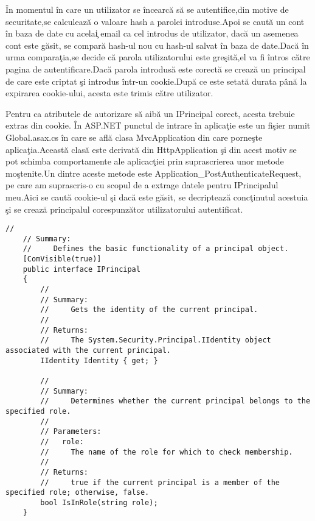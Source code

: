 \documentclass[a4paper,12pt]{report}
\begin{document}
\^In momentul \^in care un utilizator se \^incearc\u a s\u a se autentifice,din motive de securitate,se calculeaz\u a o valoare hash a parolei
introduse.Apoi se caut\u a un cont \^in baza de date cu acela\c i email ca cel introdus de utilizator, dac\u a un asemenea cont este g\u asit,
se compar\u a hash-ul nou cu hash-ul salvat \^in baza de date.Dac\u a \^in urma compara\c tia,se decide c\u a parola utilizatorului este gre\c sit\u a,el
va fi \^intros c\u atre pagina de autentificare.Dac\u a parola introdus\u a este corect\u a se creaz\u a un principal de care este criptat \c si 
introdus \^intr-un cookie.Dup\u a ce este setat\u a durata p\^an\u a la expirarea cookie-ului, acesta este trimis c\u atre utilizator.

Pentru ca atributele de autorizare s\u a aib\u a un IPrincipal corect, acesta trebuie extras din cookie.
\^In ASP.NET punctul de intrare \^in aplica\c tie este un fi\c sier numit Global.asax.cs \^in care se 
afl\u a clasa MvcApplication din care porne\c ste aplica\c tia.Aceast\u a clas\u a este derivat\u a din HttpApplication
\c si din acest motiv se pot schimba comportamente ale aplicac\c tiei prin suprascrierea 
unor metode mo\c stenite.Un dintre aceste metode este Application\_PostAuthenticateRequest, pe care am suprascris-o 
cu scopul de a extrage datele pentru IPrincipalul meu.Aici se caut\u a cookie-ul \c si dac\u a este 
g\u asit, se decripteaz\u a conc\c tinutul acestuia \c si se creaz\u a principalul corespunz\u ator 
utilizatorului autentificat.



\begin{lstlisting}[caption={Interfa\c ta IPrincipal},label={lst:IPrincipal},breaklines]
    //
    // Summary:
    //     Defines the basic functionality of a principal object.
    [ComVisible(true)]
    public interface IPrincipal
    {
        //
        // Summary:
        //     Gets the identity of the current principal.
        //
        // Returns:
        //     The System.Security.Principal.IIdentity object associated with the current principal.
        IIdentity Identity { get; }

        //
        // Summary:
        //     Determines whether the current principal belongs to the specified role.
        //
        // Parameters:
        //   role:
        //     The name of the role for which to check membership.
        //
        // Returns:
        //     true if the current principal is a member of the specified role; otherwise, false.
        bool IsInRole(string role);
    }
\end{lstlisting}
\end{document}
